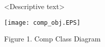 %


<Descriptive text>

\begin{center}
\texttt{[image: comp\_obj.EPS]}
   
Figure 1.  Comp Class Diagram
   
\end{center}
